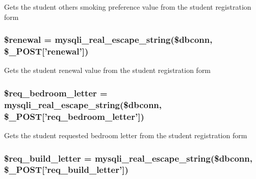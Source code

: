 \-Gets the student others smoking preference value from the student registration form \hypertarget{user__view_2validate_2studentVal_8php_a1a67d224b0f0712693c41c17f2c85183}{
\subsubsection[{\$renewal}]{\setlength{\rightskip}{0pt plus 5cm}\$renewal = mysqli\-\_\-real\-\_\-escape\-\_\-string(\$dbconn, \$\-\_\-\-P\-O\-S\-T\mbox{[}'renewal'\mbox{]})}}\label{user__view_2validate_2studentVal_8php_a1a67d224b0f0712693c41c17f2c85183}
\-Gets the student renewal value from the student registration form \hypertarget{user__view_2validate_2studentVal_8php_adab4b11b8fdbb9622f5c281bcdcc8c5d}{
\subsubsection[{\$req\-\_\-bedroom\-\_\-letter}]{\setlength{\rightskip}{0pt plus 5cm}\$req\-\_\-bedroom\-\_\-letter = mysqli\-\_\-real\-\_\-escape\-\_\-string(\$dbconn, \$\-\_\-\-P\-O\-S\-T\mbox{[}'req\-\_\-bedroom\-\_\-letter'\mbox{]})}}\label{user__view_2validate_2studentVal_8php_adab4b11b8fdbb9622f5c281bcdcc8c5d}
\-Gets the student requested bedroom letter from the student registration form \hypertarget{user__view_2validate_2studentVal_8php_ad5410bee895d3866331bed8468ce1a49}{
\subsubsection[{\$req\-\_\-build\-\_\-letter}]{\setlength{\rightskip}{0pt plus 5cm}\$req\-\_\-build\-\_\-letter = mysqli\-\_\-real\-\_\-escape\-\_\-string(\$dbconn, \$\-\_\-\-P\-O\-S\-T\mbox{[}'req\-\_\-build\-\_\-letter'\mbox{]})}}\label{user__view_2validate_2studentVal_8php_ad5410bee895d3866331bed8468ce1a49}

